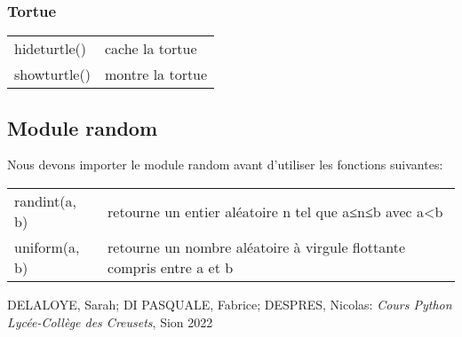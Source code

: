 \documentclass[a4paper,11pt]{article}
\begin{document}
\subsubsection{Tortue}
\begin{tabular}{l l}
hideturtle() & cache la tortue\\
showturtle() & montre la tortue\\
\end{tabular}

\subsection{Module random}
Nous devons importer le module random avant d'utiliser les fonctions suivantes:\par
\begin{tabular}{l l}
randint(a, b) & retourne un entier aléatoire n tel que a≤n≤b avec a<b\\
uniform(a, b) & retourne un nombre aléatoire à virgule flottante compris entre a et b\\
\end{tabular}


\vfill
\renewcommand{\refname}{Références}
\begin{thebibliography}{9}
 DELALOYE, Sarah; DI PASQUALE, Fabrice; DESPRES, Nicolas: \emph{Cours Python Lycée-Collège des Creusets}, Sion 2022
\end{thebibliography}
\end{document}
